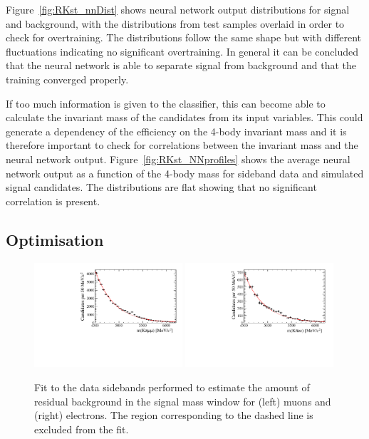 Figure~\ref{fig:RKst_nnDist} shows neural network output distributions for signal and background, with
the distributions from test samples overlaid in order to check for overtraining. 
The distributions follow the same shape but with different fluctuations indicating no
significant overtraining. In general it can be concluded that the neural network is able to separate signal
from background and that the training converged properly.

If too much information is given to the classifier, this can become able to calculate the invariant mass of the candidates 
from its input variables. This could generate a dependency of the efficiency on the 4-body invariant mass and it is therefore 
important to check for correlations between the invariant mass and the neural network output. Figure~\ref{fig:RKst_NNprofiles} 
shows the average neural network output as a function of the 4-body mass for sideband data and simulated signal candidates. 
The distributions are flat showing that no significant correlation is present.


\subsection{Optimisation}
\label{sec:optimisation}

\begin{figure}[t!]
\centering
\includegraphics[width=0.49\textwidth]{RKst/figs/Optimisation/optimizeCut_MM-q2central/fitB_MM_0.pdf}
\includegraphics[width=0.49\textwidth]{RKst/figs/Optimisation/optimizeCut_EE-q2central/fitB_EE_0.pdf}
\caption{Fit to the data sidebands performed to estimate the amount of residual background in the
signal mass window for (left) muons and (right) electrons. The region corresponding to the dashed line is excluded from the fit.}
\label{fig:sideband_fit}
\end{figure}

